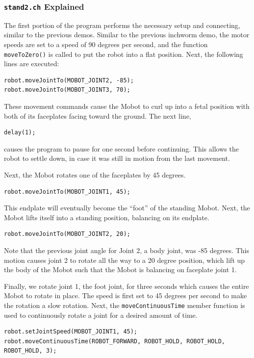 \documentclass{article}
\begin{document}
\subsubsection{\texttt{stand2.ch} Explained}
The first portion of the program performs the necessary setup and connecting,
similar to the previous demos. Similar to the previous inchworm demo, the
motor speeds are set to a speed of 90 degrees per second, and the function \texttt{moveToZero()} is
called to put the robot into a flat position. Next, the following lines
are executed:
\begin{verbatim}
robot.moveJointTo(MOBOT_JOINT2, -85);
robot.moveJointTo(MOBOT_JOINT3, 70);
\end{verbatim}
These movement commands cause the Mobot to curl up into a fetal position with
both of its faceplates facing toward the ground. The next line, 

\begin{verbatim}
delay(1);
\end{verbatim}
causes the program to pause for one second before continuing. This allows the
robot to settle down, in case it was still in motion from the last movement.

Next, the Mobot rotates one 
of the faceplates by 45 degrees. 
\begin{verbatim}
robot.moveJointTo(MOBOT_JOINT1, 45);
\end{verbatim}
This endplate will eventually become the ``foot'' of the standing Mobot. Next,
the Mobot lifts itself into a standing position, balancing on its endplate.
\begin{verbatim}
robot.moveJointTo(MOBOT_JOINT2, 20);
\end{verbatim}
Note that the previous joint angle for Joint 2, a body joint, was -85 degrees. 
This motion causes joint 2 to rotate all the way to a 20 degree position, which
lift up the body of the Mobot such that the Mobot is balancing on faceplate joint 1.

Finally, we rotate joint 1, the foot joint, for three seconds which causes the
entire Mobot to rotate in place. The speed is first set to 45 degrees per second to make the
rotation a slow rotation. Next, the \texttt{moveContinuousTime} member function
is used to continuously rotate a joint for a desired amount of time.
\begin{verbatim}
robot.setJointSpeed(MOBOT_JOINT1, 45);
robot.moveContinuousTime(ROBOT_FORWARD, ROBOT_HOLD, ROBOT_HOLD, ROBOT_HOLD, 3);
\end{verbatim}
\end{document}
